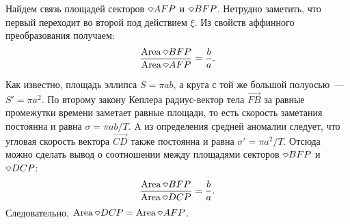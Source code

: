 Найдем связь площадей секторов $\sector AFP$ и $\sector BFP$. Нетрудно заметить, что первый переходит во второй под действием $\xi$. Из свойств аффинного преобразования получаем:
\begin{equation*}
	\frac{\area \sector BFP}{\area \sector AFP} = \frac{b}{a}.
\end{equation*}


Как известно, площадь эллипса $S = \pi ab$, а круга с той же большой полуосью~---  $S' = \pi a^2$. По второму закону Кеплера радиус-вектор тела $\overrightarrow{FB}$ за равные промежутки времени заметает равные площади, то есть скорость заметания постоянна и равна $\sigma = \pi a b / T$. A из определения средней аномалии следует, что угловая скорость вектора $\overrightarrow{CD}$ также постоянна и равна $\sigma' = \pi a^2 / T$. Отсюда можно сделать вывод о соотношении между площадями секторов $\sector BFP$ и $ \sector DCP$:
\begin{equation*}
	\frac{\area \sector BFP}{\area \sector DCP} = \frac{b}{a}.
\end{equation*}
Следовательно, $\area \sector DCP = \area \sector AFP$.

